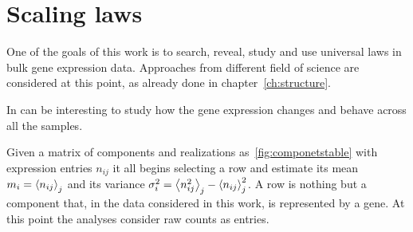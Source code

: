 \chapter{Scaling laws}\label{ch:scalinglaws}
One of the goals of this work is to search, reveal, study and use universal laws in bulk gene expression data. Approaches from different field of science are considered at this point, as already done in chapter~\ref{ch:structure}.~\nocite{altmann2016statistical}

In can be interesting to study how the gene expression changes and behave across all the samples.

Given a matrix of components and realizations as~\ref{fig:componetstable} with expression entries $n_{i j}$ it all begins selecting a row and estimate its mean $m_i=\left\langle n_{i
 j}\right\rangle_j$ and its variance $\sigma^2_{i}=\left\langle n_{i j}^2\right\rangle_j - \left\langle n_{i j}\right\rangle^2_j$. A row is nothing but a component that, in the data considered in this work, is represented by a gene. At this point the analyses consider raw counts as entries.  


\FloatBarrier



